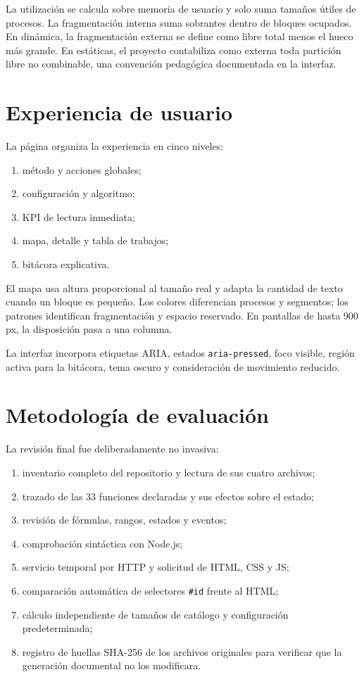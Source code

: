 \documentclass[11pt,a4paper]{article}
\begin{document}
La utilización se calcula sobre memoria de usuario y solo suma tamaños útiles de
procesos. La fragmentación interna suma sobrantes dentro de bloques ocupados. En
dinámica, la fragmentación externa se define como libre total menos el hueco más
grande. En estáticas, el proyecto contabiliza como externa toda partición libre no
combinable, una convención pedagógica documentada en la interfaz.

\section{Experiencia de usuario}

La página organiza la experiencia en cinco niveles:

\begin{enumerate}
  \item método y acciones globales;
  \item configuración y algoritmo;
  \item KPI de lectura inmediata;
  \item mapa, detalle y tabla de trabajos;
  \item bitácora explicativa.
\end{enumerate}

El mapa usa altura proporcional al tamaño real y adapta la cantidad de texto cuando
un bloque es pequeño. Los colores diferencian procesos y segmentos; los patrones
identifican fragmentación y espacio reservado. En pantallas de hasta 900 px, la
disposición pasa a una columna.

La interfaz incorpora etiquetas ARIA, estados \texttt{aria-pressed}, foco visible,
región activa para la bitácora, tema oscuro y consideración de movimiento reducido.

\section{Metodología de evaluación}

La revisión final fue deliberadamente no invasiva:

\begin{enumerate}
  \item inventario completo del repositorio y lectura de sus cuatro archivos;
  \item trazado de las 33 funciones declaradas y sus efectos sobre el estado;
  \item revisión de fórmulas, rangos, estados y eventos;
  \item comprobación sintáctica con Node.js;
  \item servicio temporal por HTTP y solicitud de HTML, CSS y JS;
  \item comparación automática de selectores \texttt{\#id} frente al HTML;
  \item cálculo independiente de tamaños de catálogo y configuración predeterminada;
  \item registro de huellas SHA-256 de los archivos originales para verificar que
  la generación documental no los modificara.
\end{enumerate}
\end{document}
